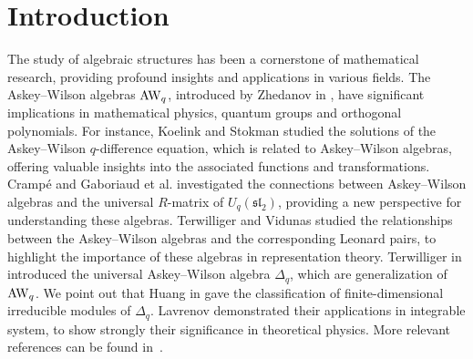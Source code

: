 \documentclass[pdftex]{sigma}
\numberwithin{equation}{section}
\begin{document}
\allowdisplaybreaks

\newcommand{\arXivNumber}{2407.10404}

\renewcommand{\PaperNumber}{115}

\FirstPageHeading








\section{Introduction}
The study of algebraic structures has been a cornerstone of mathematical research, providing profound insights and applications in various fields.
The Askey--Wilson algebras ${\rm AW}_q$, introduced by Zhedanov in \cite{Zhe(1991)}, have significant implications in mathematical physics, quantum groups and orthogonal polynomials.
For instance, Koelink and Stokman \cite{KS(2001)} studied the solutions of the Askey--Wilson $q$-difference equation, which is related to Askey--Wilson algebras, offering valuable insights into the associated functions and transformations.
Cramp\'{e} and Gaboriaud et al. \cite{CGVZ(2020)} investigated the connections between Askey--Wilson algebras and the universal $R$-matrix of $U_q(\mathfrak{sl}_2)$, providing a new perspective for understanding these algebras.
Terwilliger and Vidunas \cite{TV(2004)} studied the relationships between the Askey--Wilson algebras and the corresponding Leonard pairs, to highlight the importance of these algebras in representation theory.
Terwilliger in \cite{Ter(2011)} introduced the universal Askey--Wilson algebra $\Delta_q$, which are generalization of ${\rm AW}_q$.
We point out that Huang in \cite{Huang(2015),Huang(2021)} gave the classification of finite-dimensional irreducible modules of $\Delta_q$.
Lavrenov \cite{Lav(1997)} demonstrated their applications in integrable system, to show strongly their significance in theoretical physics.
More relevant references can be found in~\cite{CFGPRV(2021),CVZ(2021),GW(2023),Koor(2007),Koor(2008)}.
\end{document}
